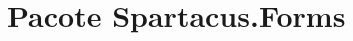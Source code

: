 \hypertarget{namespaceSpartacus_1_1Forms}{\section{Pacote Spartacus.\+Forms}
\label{namespaceSpartacus_1_1Forms}
}
